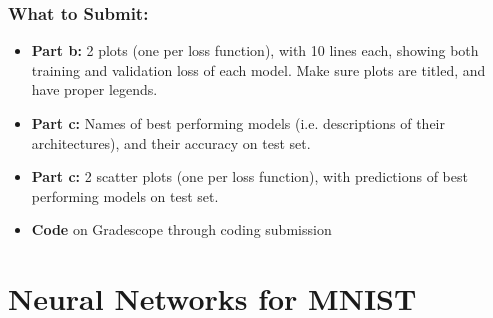 \documentclass{article}
\begin{document}
\begin{aprob}
    \subsubsection*{What to Submit:}
    \begin{itemize}
        \item \textbf{Part b:} 2 plots (one per loss function), with 10 lines each, showing both training and validation loss of each model. Make sure plots are titled, and have proper legends.
        \item \textbf{Part c:} Names of best performing models (i.e. descriptions of their architectures), and their accuracy on test set.
        \item \textbf{Part c:} 2 scatter plots (one per loss function), with predictions of best performing models on test set.
        \item \textbf{Code} on Gradescope through coding submission
    \end{itemize}
\end{aprob}

\section*{Neural Networks for MNIST}
\end{document}
